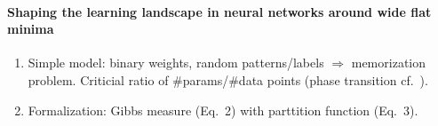 \documentclass[10pt,a4pape]{article}
\begin{document}
\newpage




\paragraph{Shaping the learning landscape in neural networks around wide flat
  minima \cite{baldassi2019shaping}}

\begin{enumerate}
\item Simple model: binary weights, random patterns/labels $\Rightarrow$ memorization problem. Criticial ratio of \#params/\#data points (phase transition cf.~\cite{krauth1989storage}). 
\item Formalization: Gibbs measure (Eq.~2) with parttition function (Eq.~3).
\end{enumerate}




\end{document}

